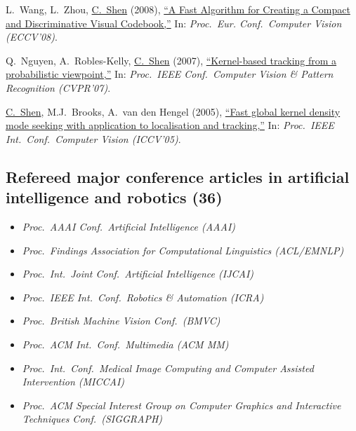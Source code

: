\documentclass[9pt, a4paper]{article}
\newcommand{\years}[1]{\marginnote{\scriptsize #1}}
\def\highlight{\uline}
\begin{document}
\medskip

\years{2008} L.~Wang, L.~Zhou, \highlight{C.~Shen} (2008),
\href{http://www.google.com/search?lr=&ie=UTF-8&oe=UTF-8&q=A+Fast+Algorithm+for+Creating+a+Compact+and+Discriminative+Visual+Codebook+Lei+Wang%2C+Luping+Zhou%2C+Chunhua+Shen}{``A Fast Algorithm for Creating a Compact and Discriminative Visual Codebook,{}''}
In: \emph{Proc.\ Eur. Conf.\  Computer Vision (ECCV'08)}.

\medskip

\years{2007} Q.~Nguyen, A.~Robles-Kelly, \highlight{C.~Shen} (2007),
\href{http://www.google.com/search?lr=&ie=UTF-8&oe=UTF-8&q=Kernel-based+tracking+from+a+probabilistic+viewpoint+Quang+Nguyen%2C+Antonio+Robles-Kelly%2C+Chunhua+Shen}{``Kernel-based tracking from a probabilistic viewpoint,{}''}
In: \emph{Proc.\ IEEE Conf.\  Computer Vision \& Pattern Recognition (CVPR'07)}.

\medskip

\years{2005} \highlight{C.~Shen}, M.J.~Brooks, A.~van den Hengel (2005),
\href{http://www.google.com/search?lr=&ie=UTF-8&oe=UTF-8&q=Fast+global+kernel+density+mode+seeking+with+application+to+localisation+and+tracking+Chunhua+Shen%2C+Michael+J.+Brooks%2C+Anton+van+den+Hengel}{``Fast global kernel density mode seeking with application to localisation and tracking,{}''}
In: \emph{Proc.\ IEEE Int.\ Conf.\  Computer Vision (ICCV'05)}.

\medskip

\vspace{-0.15cm}
\subsection*{Refereed major conference articles in artificial intelligence and robotics (36)}

{
\begin{itemize}
  \itemsep -.12cm
\footnotesize
\item \emph{Proc.\ AAAI Conf.\ Artificial Intelligence (AAAI)}
\item \emph{Proc.\ Findings Association for Computational Linguistics (ACL/EMNLP)}
\item \emph{Proc.\ Int.\ Joint Conf.\ Artificial Intelligence (IJCAI)}
\item \emph{Proc.\ IEEE Int.\ Conf.\ Robotics \& Automation (ICRA)}
\item \emph{Proc.\ British Machine Vision Conf.\ (BMVC)}
\item \emph{Proc.\ ACM Int.\ Conf.\ Multimedia (ACM MM)}
\item \emph{Proc.\ Int.\ Conf.\ Medical Image Computing and Computer Assisted Intervention (MICCAI)}
\item \emph{Proc.\ ACM Special Interest Group on Computer Graphics and Interactive Techniques Conf.\ (SIGGRAPH)}
\end{itemize}
}
\end{document}
